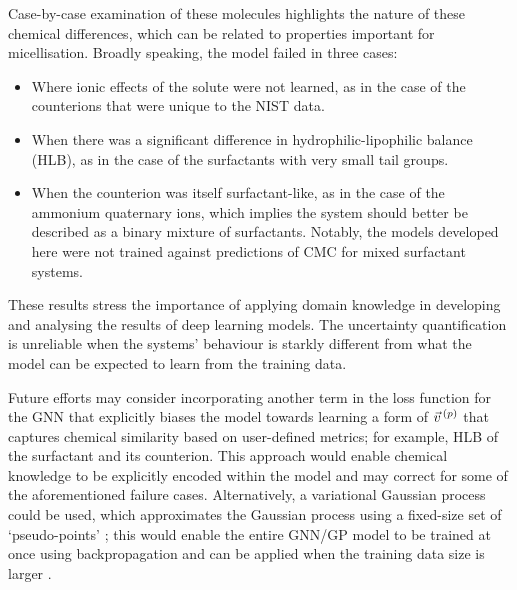 Case-by-case examination of these molecules highlights the nature of these
chemical differences, which can be related to properties important for
micellisation. Broadly speaking, the model failed in three cases:
\begin{itemize}
    \item Where ionic effects of the solute were not learned, as in the case of the counterions that were unique to the NIST data.
    \item When there was a significant difference in hydrophilic-lipophilic balance (HLB), as in the case of the surfactants with very small tail groups.
    \item When the counterion was itself surfactant-like, as in the case of the
          ammonium quaternary ions, which implies the system should better be
          described as a binary mixture of surfactants. Notably, the models
          developed here were not trained against predictions of CMC for mixed
          surfactant systems.
\end{itemize}
These results stress the importance of applying domain knowledge in developing
and analysing the results of deep learning models. The uncertainty
quantification is unreliable when the systems' behaviour is starkly different
from what the model can be expected to learn from the training data.

Future efforts may consider incorporating another term in the loss function for
the GNN that explicitly biases the model towards learning a form of $\vec{v}^{\,(p)}{}$
that captures chemical similarity based on user-defined metrics; for example,
HLB of the surfactant and its counterion. This approach would enable chemical
knowledge to be explicitly encoded within the model and may correct for some of
the aforementioned failure cases. Alternatively, a variational Gaussian process
could be used, which approximates the Gaussian process using a fixed-size set of
`pseudo-points' \cite{hensmanGaussianProcessesBig2013}; this would enable the
entire GNN/GP model to be trained at once using backpropagation and can be
applied when the training data size is larger
\cite{moriartyUnlockNNUncertaintyQuantification2022}.
